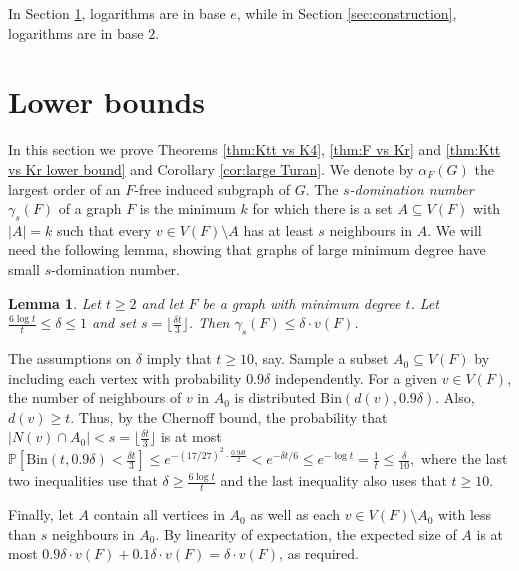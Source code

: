 \documentclass[11pt]{article}
\let\oldendproof\endproof
\renewenvironment{proof}[1][\proofname]{\oldproof[\bf #1]}{\oldendproof}
\theoremstyle{plain}
\newtheorem{lemma}[theorem]{Lemma}
\theoremstyle{definition}
\newcommand{\Bin}{\ensuremath{\textrm{Bin}}}
\begin{document}
In Section \ref{sec:Ktt-free}, logarithms are in base $e$, while in Section \ref{sec:construction}, logarithms are in base $2$.

\section{Lower bounds}\label{sec:Ktt-free}
In this section we prove Theorems \ref{thm:Ktt vs K4}, \ref{thm:F vs Kr} and \ref{thm:Ktt vs Kr lower bound} and Corollary \ref{cor:large Turan}.
We denote by $\alpha_F(G)$ the largest order of an $F$-free induced subgraph of $G$.
The {\em $s$-domination number} $\gamma_s(F)$ of a graph $F$ is the minimum $k$ for which there is a set $A \subseteq V(F)$ with $|A| = k$ such that every $v \in V(F) \setminus A$ has at least $s$ neighbours in $A$. We will need the following lemma, showing that graphs of large minimum degree have small $s$-domination number.
\begin{lemma}\label{lem:domination}
Let $t\geq 2$ and let $F$ be a graph with minimum degree $t$. Let $\frac{6\log t}{t} \leq \delta \leq 1$ and set $s = \lfloor \frac{\delta t}{3} \rfloor$. Then $\gamma_s(F) \leq \delta \cdot v(F)$. 
\end{lemma}
\begin{proof}
The assumptions on $\delta$ imply that $t \geq 10$, say. 
Sample a subset $A_0 \subseteq V(F)$ by including each vertex with probability $0.9\delta$ independently. 
For a given $v \in V(F)$, the number of neighbours of $v$ in $A_0$ is distributed $\Bin(d(v),0.9\delta)$. Also, $d(v) \geq t$. 
Thus, by the Chernoff bound, the probability that $|N(v) \cap A_0| < s = \lfloor \frac{\delta t}{3} \rfloor$ is at most 
$\mathbb{P}\left[ \Bin(t,0.9\delta) < \frac{\delta t}{3} \right] \leq e^{-(17/27)^2 \cdot \frac{0.9\delta t}{2}} < e^{-\delta t/6}
\leq e^{-\log t} = \frac{1}{t} \leq \frac{\delta}{10},$ where the last two inequalities use that $\delta \geq \frac{6\log t}{t}$ and the last inequality also uses that $t\geq 10$.

Finally, let $A$ contain all vertices in $A_0$ as well as each $v \in V(F) \setminus A_0$ with less than $s$ neighbours in $A_0$. By linearity of expectation, the expected size of $A$ is at most $0.9\delta \cdot v(F) + 0.1 \delta \cdot v(F) = \delta \cdot v(F)$, as required.     
\end{proof}
\end{document}
